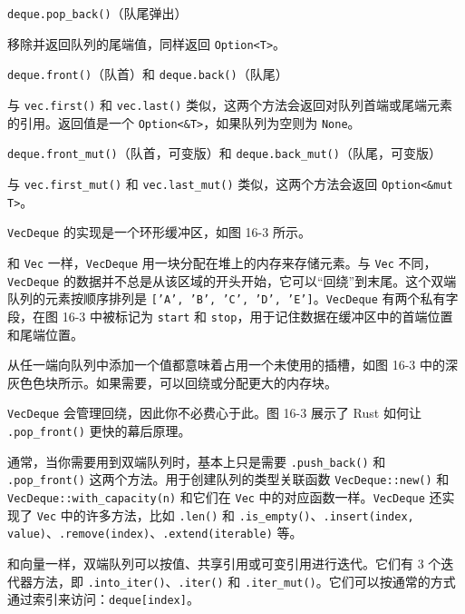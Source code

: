 \begin{mySidenote}
\texttt{deque.pop\_back()}（队尾弹出）
\end{mySidenote}

移除并返回队列的尾端值，同样返回 \texttt{Option<T>}。

\begin{myNote}
\texttt{deque.front()}（队首）和 \texttt{deque.back()}（队尾）
\end{myNote}

与 \texttt{vec.first()} 和 \texttt{vec.last()} 类似，这两个方法会返回对队列首端或尾端元素的引用。返回值是一个 \texttt{Option<\&T>}，如果队列为空则为 \texttt{None}。

\begin{myNote}
\texttt{deque.front\_mut()}（队首，可变版）和 \texttt{deque.back\_mut()}（队尾，可变版）
\end{myNote}

与 \texttt{vec.first\_mut()} 和 \texttt{vec.last\_mut()} 类似，这两个方法会返回 \texttt{Option<\&mut T>}。

\texttt{VecDeque} 的实现是一个环形缓冲区，如图 16-3 所示。


和 \texttt{Vec} 一样，\texttt{VecDeque} 用一块分配在堆上的内存来存储元素。与 \texttt{Vec} 不同，\texttt{VecDeque} 的数据并不总是从该区域的开头开始，它可以“回绕”到末尾。这个双端队列的元素按顺序排列是 \texttt{['A', 'B', 'C', 'D', 'E']}。\texttt{VecDeque} 有两个私有字段，在图 16-3 中被标记为 \texttt{start} 和 \texttt{stop}，用于记住数据在缓冲区中的首端位置和尾端位置。

从任一端向队列中添加一个值都意味着占用一个未使用的插槽，如图 16-3 中的深灰色色块所示。如果需要，可以回绕或分配更大的内存块。

\texttt{VecDeque} 会管理回绕，因此你不必费心于此。图 16-3 展示了 Rust 如何让 \texttt{.pop\_front()} 更快的幕后原理。

通常，当你需要用到双端队列时，基本上只是需要 \texttt{.push\_back()} 和 \texttt{.pop\_front()} 这两个方法。用于创建队列的类型关联函数 \texttt{VecDeque::new()} 和 \texttt{VecDeque::with\_capacity(n)} 和它们在 \texttt{Vec} 中的对应函数一样。\texttt{VecDeque} 还实现了 \texttt{Vec} 中的许多方法，比如 \texttt{.len()} 和 \texttt{.is\_empty()}、\texttt{.insert(index, value)}、\texttt{.remove(index)}、\texttt{.extend(iterable)} 等。

和向量一样，双端队列可以按值、共享引用或可变引用进行迭代。它们有 3 个迭代器方法，即 \texttt{.into\_iter()}、\texttt{.iter()} 和 \texttt{.iter\_mut()}。它们可以按通常的方式通过索引来访问：\texttt{deque[index]}。

